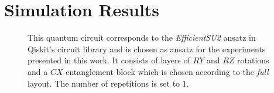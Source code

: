 \documentclass[twocolumn, aps, pra, superscriptaddress]{revtex4-1}
\begin{document}
\section{Simulation Results}
\label{sec:results}

\begin{figure}[h!]
\captionsetup{singlelinecheck = false, format= hang, justification=centerlast, font=footnotesize, labelsep=space}
\begin{center}
\end{center}
\caption{This quantum circuit corresponds to the \emph{EfficientSU2} ansatz in  Qiskit's \cite{qiskit_2019} circuit library and is chosen as ansatz for the experiments presented in this work. It consists of layers of $RY$ and $RZ$ rotations and a $CX$ entanglement block which is chosen according to the \textit{full} layout. The number of repetitions is set to $1$.}
\label{fig:effsu2}
\end{figure}
\end{document}
